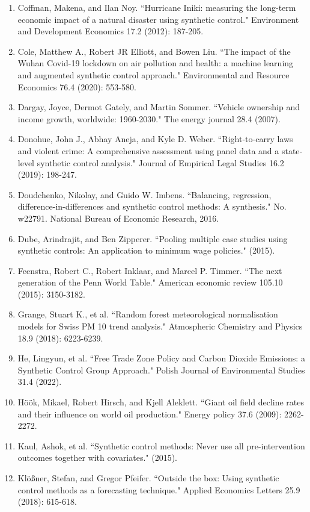 \documentclass[12pt,a4paper,draft]{article}
\begin{document}
\begin{enumerate}
    \item Coffman, Makena, and Ilan Noy. ``Hurricane Iniki: measuring the long-term economic impact of a natural disaster using synthetic control." Environment and Development Economics 17.2 (2012): 187-205.
    \item Cole, Matthew A., Robert JR Elliott, and Bowen Liu. ``The impact of the Wuhan Covid-19 lockdown on air pollution and health: a machine learning and augmented synthetic control approach." Environmental and Resource Economics 76.4 (2020): 553-580.
    \item Dargay, Joyce, Dermot Gately, and Martin Sommer. ``Vehicle ownership and income growth, worldwide: 1960-2030." The energy journal 28.4 (2007).
    \item Donohue, John J., Abhay Aneja, and Kyle D. Weber. ``Right-to-carry laws and violent crime: A comprehensive assessment using panel data and a state‐level synthetic control analysis." Journal of Empirical Legal Studies 16.2 (2019): 198-247.
    \item Doudchenko, Nikolay, and Guido W. Imbens. ``Balancing, regression, difference-in-differences and synthetic control methods: A synthesis." No. w22791. National Bureau of Economic Research, 2016.
    \item Dube, Arindrajit, and Ben Zipperer. ``Pooling multiple case studies using synthetic controls: An application to minimum wage policies." (2015).
    \item Feenstra, Robert C., Robert Inklaar, and Marcel P. Timmer. ``The next generation of the Penn World Table." American economic review 105.10 (2015): 3150-3182.
    \item Grange, Stuart K., et al. ``Random forest meteorological normalisation models for Swiss PM 10 trend analysis." Atmospheric Chemistry and Physics 18.9 (2018): 6223-6239.
    \item He, Lingyun, et al. ``Free Trade Zone Policy and Carbon Dioxide Emissions: a Synthetic Control Group Approach." Polish Journal of Environmental Studies 31.4 (2022).
    \item Höök, Mikael, Robert Hirsch, and Kjell Aleklett. ``Giant oil field decline rates and their influence on world oil production." Energy policy 37.6 (2009): 2262-2272.
    \item Kaul, Ashok, et al. ``Synthetic control methods: Never use all pre-intervention outcomes together with covariates." (2015).
    \item Klößner, Stefan, and Gregor Pfeifer. ``Outside the box: Using synthetic control methods as a forecasting technique." Applied Economics Letters 25.9 (2018): 615-618.

\end{enumerate}
\end{document}
